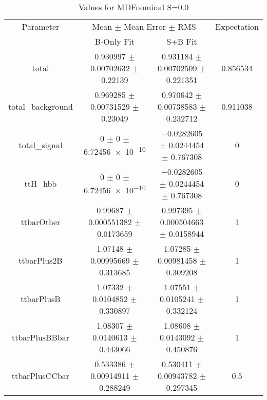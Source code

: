 \begin{table}
\centering
\caption{Values for MDFnominal S=0.0}
\begin{tabular}{cccc}
\toprule
Parameter & \multicolumn{2}{c}{Mean $\pm$ Mean Error $\pm$ RMS} & Expectation\\
 & B-Only Fit & S+B Fit & \\
\midrule
total & \num{0.930997} $\pm$ \num{0.00702632} $\pm$ \num{0.22139} & \num{0.931184} $\pm$ \num{0.00702509} $\pm$ \num{0.221351} & \num{0.856534}\\
total\_background & \num{0.969285} $\pm$ \num{0.00731529} $\pm$ \num{0.23049} & \num{0.970642} $\pm$ \num{0.00738583} $\pm$ \num{0.232712} & \num{0.911038}\\
total\_signal & \num{0} $\pm$ \num{0} $\pm$ \num{6.72456e-10} & \num{-0.0282605} $\pm$ \num{0.0244454} $\pm$ \num{0.767308} & \num{0}\\
ttH\_hbb & \num{0} $\pm$ \num{0} $\pm$ \num{6.72456e-10} & \num{-0.0282605} $\pm$ \num{0.0244454} $\pm$ \num{0.767308} & \num{0}\\
ttbarOther & \num{0.99687} $\pm$ \num{0.000551382} $\pm$ \num{0.0173659} & \num{0.997395} $\pm$ \num{0.000504663} $\pm$ \num{0.0158944} & \num{1}\\
ttbarPlus2B & \num{1.07148} $\pm$ \num{0.00995669} $\pm$ \num{0.313685} & \num{1.07285} $\pm$ \num{0.00981458} $\pm$ \num{0.309208} & \num{1}\\
ttbarPlusB & \num{1.07332} $\pm$ \num{0.0104852} $\pm$ \num{0.330897} & \num{1.07551} $\pm$ \num{0.0105241} $\pm$ \num{0.332124} & \num{1}\\
ttbarPlusBBbar & \num{1.08307} $\pm$ \num{0.0140613} $\pm$ \num{0.443066} & \num{1.08608} $\pm$ \num{0.0143092} $\pm$ \num{0.450876} & \num{1}\\
ttbarPlusCCbar & \num{0.533386} $\pm$ \num{0.00914911} $\pm$ \num{0.288249} & \num{0.530411} $\pm$ \num{0.00943782} $\pm$ \num{0.297345} & \num{0.5}\\
\bottomrule
\end{tabular}
\end{table}